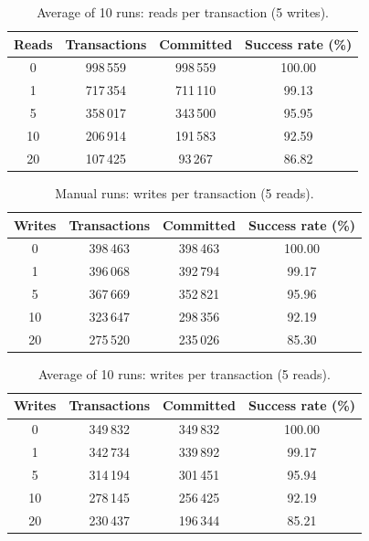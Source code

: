 \begin{table}[h]
\centering
\caption{Average of 10 runs: reads per transaction (5 writes).}
\begin{tabular}{|c|c|c|c|}
\hline
Reads & Transactions & Committed & Success rate (\%) \\
\hline
0 & 998\,559 & 998\,559 & 100.00 \\
1 & 717\,354 & 711\,110 & 99.13 \\
5 & 358\,017 & 343\,500 & 95.95 \\
10 & 206\,914 & 191\,583 & 92.59 \\
20 & 107\,425 & 93\,267 & 86.82 \\
\hline
\end{tabular}
\end{table}

\begin{table}[h]
\centering
\caption{Manual runs: writes per transaction (5 reads).}
\begin{tabular}{|c|c|c|c|}
\hline
Writes & Transactions & Committed & Success rate (\%) \\
\hline
0 & 398\,463 & 398\,463 & 100.00 \\
1 & 396\,068 & 392\,794 & 99.17 \\
5 & 367\,669 & 352\,821 & 95.96 \\
10 & 323\,647 & 298\,356 & 92.19 \\
20 & 275\,520 & 235\,026 & 85.30 \\
\hline
\end{tabular}
\end{table}

\begin{table}[h]
\centering
\caption{Average of 10 runs: writes per transaction (5 reads).}
\begin{tabular}{|c|c|c|c|}
\hline
Writes & Transactions & Committed & Success rate (\%) \\
\hline
0 & 349\,832 & 349\,832 & 100.00 \\
1 & 342\,734 & 339\,892 & 99.17 \\
5 & 314\,194 & 301\,451 & 95.94 \\
10 & 278\,145 & 256\,425 & 92.19 \\
20 & 230\,437 & 196\,344 & 85.21 \\
\hline
\end{tabular}
\end{table}

